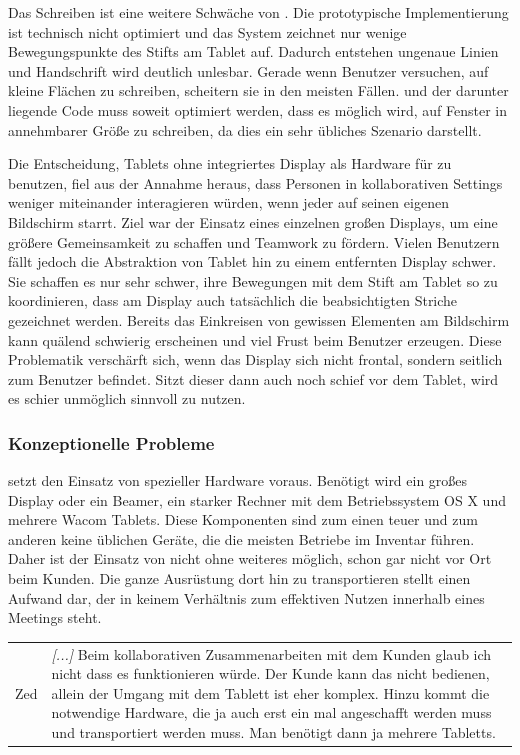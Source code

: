 \medskip Das Schreiben ist eine weitere Schwäche von \scribbler. Die prototypische Implementierung ist technisch nicht optimiert und das System zeichnet nur wenige Bewegungspunkte des Stifts am Tablet auf. Dadurch entstehen ungenaue Linien und Handschrift wird deutlich unlesbar. Gerade wenn Benutzer versuchen, auf kleine Flächen zu schreiben, scheitern sie in den meisten Fällen. \scribbler und der darunter liegende Code muss soweit optimiert werden, dass es möglich wird, auf Fenster in annehmbarer Größe zu schreiben, da dies ein sehr übliches Szenario darstellt.

\medskip Die Entscheidung, Tablets ohne integriertes Display als Hardware für \scribbler zu benutzen, fiel aus der Annahme heraus, dass Personen in kollaborativen Settings weniger miteinander interagieren würden, wenn jeder auf seinen eigenen Bildschirm starrt. Ziel war der Einsatz eines einzelnen großen Displays, um eine größere Gemeinsamkeit zu schaffen und Teamwork zu fördern. Vielen Benutzern fällt jedoch die Abstraktion von Tablet hin zu einem entfernten Display schwer. Sie schaffen es nur sehr schwer, ihre Bewegungen mit dem Stift am Tablet so zu koordinieren, dass am Display auch tatsächlich die beabsichtigten Striche gezeichnet werden. Bereits das Einkreisen von gewissen Elementen am Bildschirm kann quälend schwierig erscheinen und viel Frust beim Benutzer erzeugen. Diese Problematik verschärft sich, wenn das Display sich nicht frontal, sondern seitlich zum Benutzer befindet. Sitzt dieser dann auch noch schief vor dem Tablet, wird es schier unmöglich \scribbler sinnvoll zu nutzen.

\subsubsection{Konzeptionelle Probleme}
\scribbler setzt den Einsatz von spezieller Hardware voraus. Benötigt wird ein großes Display oder ein Beamer, ein starker Rechner mit dem Betriebssystem OS X und mehrere Wacom Tablets. Diese Komponenten sind zum einen teuer und zum anderen keine üblichen Geräte, die die meisten Betriebe im Inventar führen. Daher ist der Einsatz von \scribbler nicht ohne weiteres möglich, schon gar nicht vor Ort beim Kunden. Die ganze Ausrüstung dort hin zu transportieren stellt einen Aufwand dar, der in keinem Verhältnis zum effektiven Nutzen innerhalb eines Meetings steht.

\begin{extract}[Notwendige Hardware schränkt ein.]
	{
		\myfloatalign
		\begin{tabularx}{\textwidth}{p{1.5cm}X}
			Zed & \emph{[...]} Beim kollaborativen Zusammenarbeiten mit dem Kunden glaub ich nicht dass es funktionieren würde. Der Kunde kann das nicht bedienen, allein der Umgang mit dem Tablett ist eher komplex. Hinzu kommt die notwendige Hardware, die ja auch erst ein mal angeschafft werden muss und transportiert werden muss. Man benötigt dann ja mehrere Tabletts. 
		\end{tabularx}
	}
\end{extract}

